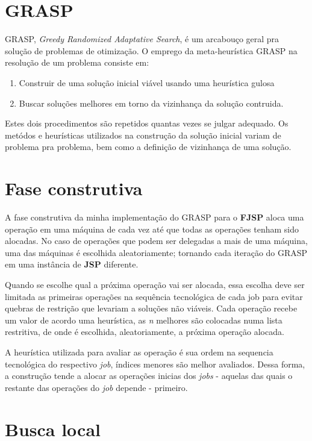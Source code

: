\documentclass{article}
\begin{document}
\section{GRASP}

GRASP, \emph{Greedy Randomized Adaptative Search}, é um arcabouço geral pra 
solução de problemas de otimização. O emprego da meta-heurística GRASP na
resolução de um problema consiste em:

\begin{enumerate}
    \item Construir de uma solução inicial viável usando uma heurística gulosa
    \item Buscar soluções melhores em torno da vizinhança da solução contruida.
\end{enumerate}

Estes dois procedimentos são repetidos quantas vezes se julgar adequado. Os 
metódos e heurísticas utilizados na construção da solução inicial variam de 
problema pra problema, bem como a definição de vizinhança de uma solução.

\section{Fase construtiva}

A fase construtiva da minha implementação do GRASP para o \textbf{FJSP}
aloca uma operação em uma máquina de cada vez até que todas as operações
tenham sido alocadas. No caso de operações que podem ser delegadas a mais
de uma máquina, uma das máquinas é escolhida aleatoriamente; tornando
cada iteração do GRASP em uma instância de \textbf{JSP} diferente.

Quando se escolhe qual a próxima operação vai ser alocada, essa escolha 
deve ser limitada as primeiras operações na sequência tecnológica de 
cada job para evitar quebras de restrição que levariam a soluções não
viáveis. Cada operação recebe um valor de acordo uma heurística, as \emph{n}
melhores são colocadas numa lista restritiva, de onde é escolhida, aleatoriamente,
a próxima operação alocada.

A heurística utilizada para avaliar as operação é sua ordem na sequencia tecnológica
do respectivo \emph{job}, índices menores são melhor avaliados. Dessa forma,
a construção tende a alocar as operações inicias dos \emph{jobs} - aquelas das 
quais o restante das operações do \emph{job} depende - primeiro.

\section{Busca local}
\end{document}
